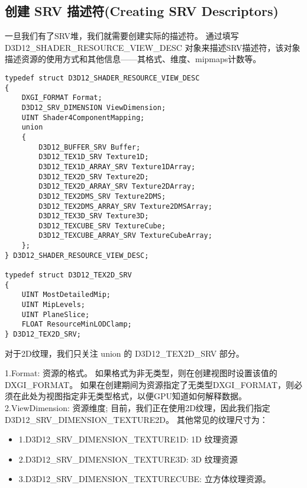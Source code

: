 \subsection{创建 SRV 描述符(Creating SRV Descriptors)}
\begin{flushleft}
一旦我们有了SRV堆，我们就需要创建实际的描述符。 通过填写 D3D12\_SHADER\_RESOURCE\_VIEW\_DESC 对象来描述SRV描述符，该对象描述资源的使用方式和其他信息——其格式、维度、mipmaps计数等。\\
\end{flushleft}

\begin{lstlisting}
typedef struct D3D12_SHADER_RESOURCE_VIEW_DESC
{
    DXGI_FORMAT Format;
    D3D12_SRV_DIMENSION ViewDimension;
    UINT Shader4ComponentMapping;
    union
    {
        D3D12_BUFFER_SRV Buffer;
        D3D12_TEX1D_SRV Texture1D;
        D3D12_TEX1D_ARRAY_SRV Texture1DArray;
        D3D12_TEX2D_SRV Texture2D;
        D3D12_TEX2D_ARRAY_SRV Texture2DArray;
        D3D12_TEX2DMS_SRV Texture2DMS;
        D3D12_TEX2DMS_ARRAY_SRV Texture2DMSArray;
        D3D12_TEX3D_SRV Texture3D;
        D3D12_TEXCUBE_SRV TextureCube;
        D3D12_TEXCUBE_ARRAY_SRV TextureCubeArray;
    };
} D3D12_SHADER_RESOURCE_VIEW_DESC;

typedef struct D3D12_TEX2D_SRV
{
    UINT MostDetailedMip;
    UINT MipLevels;
    UINT PlaneSlice;
    FLOAT ResourceMinLODClamp;
} D3D12_TEX2D_SRV;
\end{lstlisting}

\begin{flushleft}
对于2D纹理，我们只关注 union 的 D3D12\_TEX2D\_SRV 部分。\\
\end{flushleft}

\begin{flushleft}
1.Format: 资源的格式。 如果格式为非无类型，则在创建视图时设置该值的DXGI\_FORMAT。 如果在创建期间为资源指定了无类型DXGI\_FORMAT，则必须在此处为视图指定非无类型格式，以便GPU知道如何解释数据。\\

2.ViewDimension: 资源维度; 目前，我们正在使用2D纹理，因此我们指定D3D12\_SRV\_DIMENSION\_TEXTURE2D。 其他常见的纹理尺寸为：\\
\end{flushleft}

\begin{itemize}
  \item 1.D3D12\_SRV\_DIMENSION\_TEXTURE1D: 1D 纹理资源
  \item 2.D3D12\_SRV\_DIMENSION\_TEXTURE3D: 3D 纹理资源
  \item 3.D3D12\_SRV\_DIMENSION\_TEXTURECUBE: 立方体纹理资源。
\end{itemize}

